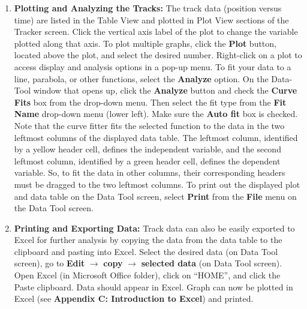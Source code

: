 \begin{enumerate}
\item {\bf Plotting and Analyzing the Tracks:} The track data (position versus time) are listed in the Table View and plotted in Plot View sections of the Tracker screen. Click the vertical axis label of the plot to change the variable plotted along that axis. To plot multiple graphs, click the {\bf Plot} button, located above the plot, and select the desired number. 
Right-click on a plot to access display and analysis options in a pop-up menu. To fit your data to a line, parabola, or other functions, select the {\bf Analyze} option. On the Data-Tool window that opens up, click the {\bf Analyze} button and check the {\bf Curve Fits} box from the drop-down menu. Then select the fit type from the {\bf Fit Name} drop-down menu (lower left). Make sure the {\bf Auto fit} box is checked. 
Note that the curve fitter fits the selected function to the data in the two leftmost columns of the displayed data table. The leftmost column, identified by a yellow header cell, defines the independent variable, and the second leftmost column, identified by a green header cell, defines the dependent variable. So, to fit the data in other columns, their corresponding headers must be dragged to the two leftmost columns. To print out the displayed plot and data table on the Data Tool screen, select {\bf Print} from the {\bf File} menu on the Data Tool screen.

\item {\bf Printing and Exporting Data:} Track data can also be easily exported to Excel for further analysis by copying the data from the data table to the clipboard and pasting into Excel. 
Select the desired data (on Data Tool screen), go to {\bf Edit} $\rightarrow$ {\bf copy} $\rightarrow$ {\bf selected data} (on Data Tool screen). 
Open Excel (in Microsoft Office folder), click on ``HOME'', and click the Paste clipboard. Data should appear in Excel. Graph can now be plotted in Excel (see {\bf Appendix C: Introduction to Excel}) and printed.

\end{enumerate} 

